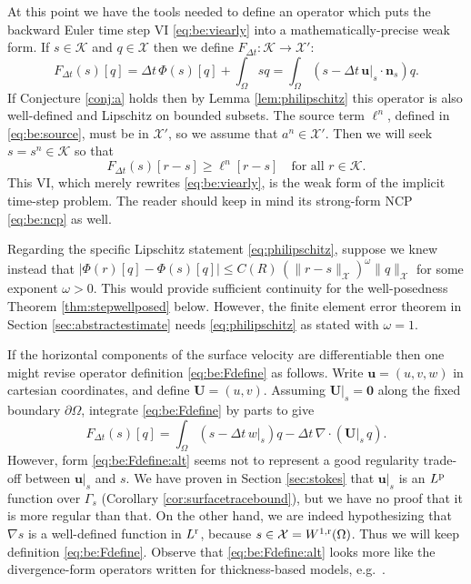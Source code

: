 \documentclass[hidelinks,onefignum,onetabnum,final]{siamart220329}  %
\newcommand{\grad}{\nabla}
\newcommand{\Div}{\nabla\cdot}
\newcommand{\bn}{\mathbf{n}}
\newcommand{\bu}{\mathbf{u}}
\newcommand{\bU}{\mathbf{U}}
\newcommand{\bzero}{\bm{0}}
\newcommand{\cK}{\mathcal{K}}
\newcommand{\cX}{\mathcal{X}}
\newcommand{\pp}{{\text{\textnormal{p}}}}
\newcommand{\rr}{{\text{\textnormal{r}}}}
\begin{document}
At this point we have the tools needed to define an operator which puts the backward Euler time step VI \eqref{eq:be:viearly} into a mathematically-precise weak form.  If $s\in\cK$ and $q\in\cX$ then we define $F_{\Delta t}:\cK\to\cX'$:
\begin{equation}
F_{\Delta t}(s)[q] = \Delta t\,\Phi(s)[q] + \int_\Omega s q = \int_\Omega \left(s - \Delta t\, \bu|_s \cdot \bn_s\right) q.  \label{eq:be:Fdefine}
\end{equation}
If Conjecture \ref{conj:a} holds then by Lemma \ref{lem:philipschitz} this operator is also well-defined and Lipschitz on bounded subsets.  The source term $\ell^n$, defined in \eqref{eq:be:source}, must be in $\cX'$, so we assume that $a^n\in\cX'$.  Then we will seek $s = s^n \in \cK$ so that
\begin{equation}
\boxed{F_{\Delta t}(s)[r-s] \ge \ell^n[r-s] \quad \text{for all } r \in \cK.} \label{eq:be:vi}
\end{equation}
This VI, which merely rewrites \eqref{eq:be:viearly}, is the weak form of the implicit time-step problem.  The reader should keep in mind its strong-form NCP \eqref{eq:be:ncp} as well.

Regarding the specific Lipschitz statement \eqref{eq:philipschitz}, suppose we knew instead that $\Big|\Phi(r)[q] - \Phi(s)[q]\Big| \le C(R)\, (\|r-s\|_{\cX})^\omega \|q\|_{\cX}$ for some exponent $\omega>0$.  This would provide sufficient continuity for the well-posedness Theorem \ref{thm:stepwellposed} below.  However, the finite element error theorem in Section \ref{sec:abstractestimate} needs \eqref{eq:philipschitz} as stated with $\omega=1$.

If the horizontal components of the surface velocity are differentiable then one might revise operator definition \eqref{eq:be:Fdefine} as follows.  Write $\bu=(u,v,w)$ in cartesian coordinates, and define $\bU=(u,v)$.  Assuming $\bU|_s=\bzero$ along the fixed boundary $\partial\Omega$, integrate \eqref{eq:be:Fdefine} by parts to give
\begin{equation}
F_{\Delta t}(s)[q] = \int_\Omega \left(s - \Delta t\, w|_s\right) q - \Delta t\, \Div\left(\bU|_s\, q\right).  \label{eq:be:Fdefine:alt}
\end{equation}
However, form \eqref{eq:be:Fdefine:alt} seems not to represent a good regularity trade-off between $\bu|_s$ and $s$.  We have proven in Section \ref{sec:stokes} that $\bu|_s$ is an $L^\pp$ function over $\Gamma_s$ (Corollary \ref{cor:surfacetracebound}), but we have no proof that it is more regular than that.  On the other hand, we are indeed hypothesizing that $\grad s$ is a well-defined function in $L^\rr$, because $s\in\cX=W^{1,\rr}(\Omega)$.  Thus we will keep definition \eqref{eq:be:Fdefine}.  Observe that \eqref{eq:be:Fdefine:alt} looks more like the divergence-form operators written for thickness-based models, e.g.~\cite{Bueler2021conservation,JouvetBueler2012}.
\end{document}
